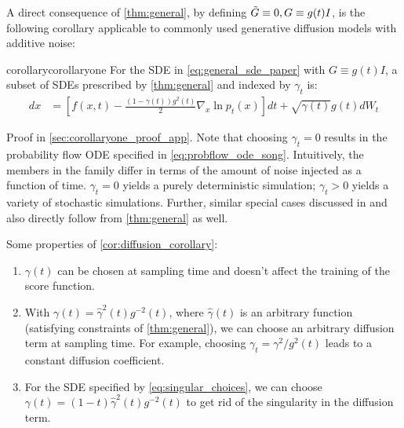 A direct consequence of \cref{thm:general}, by defining $\tilde G\equiv0, G \equiv g(t)I$, is the following corollary applicable to commonly used generative diffusion models with additive noise:
\begin{restatable}{corollary}{corollaryone}
\label{cor:diffusion_corollary}
For the SDE in \cref{eq:general_sde_paper} with $G\equiv g(t)I$, a subset of SDEs prescribed by \cref{thm:general} and indexed by $\gamma_t$ is:
\begin{align}
dx &= \left[f(x, t) - \frac{(1 - \gamma(t))g^2(t)}{2}\nabla_x \ln p_t(x)\right]dt + \sqrt{\gamma(t)} g(t) dW_t
\label{eq:diffusion_corollary}
\end{align}
\end{restatable}
Proof in \cref{sec:corollaryone_proof_app}.
Note that choosing $\gamma_t = 0$ results in the probability flow ODE specified in \cref{eq:probflow_ode_song}.
Intuitively, the members in the family differ in terms of the amount of noise injected as a function of time.
$\gamma_t = 0$ yields a purely deterministic simulation; $\gamma_t > 0$ yields a variety of stochastic simulations.
Further, similar special cases discussed in \cite{huang2021variational} and \cite{berner2022optimal} also directly follow from \cref{thm:general} as well.

Some properties of \cref{cor:diffusion_corollary}:
\begin{enumerate}[leftmargin=*]
    \item $\gamma(t)$ can be chosen at sampling time and doesn't affect the training of the score function.
    \item With $\gamma(t) = \hat \gamma^2(t)g^{-2}(t)$, where $\hat \gamma(t)$ is an arbitrary function (satisfying constraints of \cref{thm:general}), we can choose an arbitrary diffusion term at sampling time.
    For example, choosing $\gamma_t = \gamma^2/g^2(t)$ leads to a constant diffusion coefficient.
    \item For the SDE specified by \cref{eq:singular_choices}, we can choose $\gamma(t) = (1-t)\hat \gamma^2(t)g^{-2}(t)$ to get rid of the singularity in the diffusion term.
\end{enumerate}

